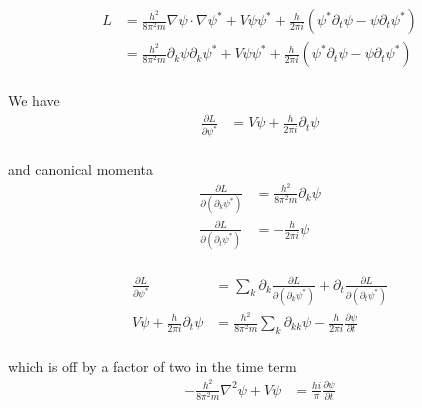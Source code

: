 \documentclass{article}
\begin{document}
\begin{align*}
L 
&= \frac{h^2}{8 \pi^2 m} \nabla \psi \cdot \nabla \psi^{*} + V \psi \psi^{*} + \frac{h}{2 \pi i} ( \psi^{*} \partial_t \psi - \psi \partial_t \psi^{*} ) \\
&= \frac{h^2}{8 \pi^2 m} \partial_k \psi \partial_k \psi^{*} + V \psi \psi^{*} + 
\frac{h}{2 \pi i} ( \psi^{*} \partial_t \psi - \psi \partial_t \psi^{*} ) \\
\end{align*}

We have
\begin{align*}
\frac{\partial L}{\partial \psi^{*} } &= V\psi + \frac{h}{2 \pi i} \partial_t \psi \\
\end{align*}

and canonical momenta
\begin{align*}
\frac{\partial L}{\partial{(\partial_k \psi^{*})}} &= \frac{h^2}{8 \pi^2 m} \partial_{k} \psi \\
\frac{\partial L}{\partial{(\partial_t \psi^{*})}} &= -\frac{h}{2 \pi i} {\psi} \\
\end{align*}

\begin{align*}
\frac{\partial L}{\partial \psi^{*}} &= \sum_k \partial_k \frac{\partial L}{\partial{(\partial_k \psi^{*})}} + \partial_t \frac{\partial L}{\partial{(\partial_t \psi^{*})}} \\
V\psi + \frac{h}{2 \pi i} \partial_t \psi &= \frac{h^2}{8 \pi^2 m} \sum_k \partial_{kk} \psi -\frac{h}{2 \pi i} \frac{\partial \psi}{\partial{t}} \\
\end{align*}

which is off by a factor of two in the time term
\begin{align*}
-\frac{h^2}{8 \pi^2 m} \nabla^2 \psi + V\psi &= \frac{h i}{\pi} \frac{\partial \psi}{\partial{t}} \\
\end{align*}
\end{document}
